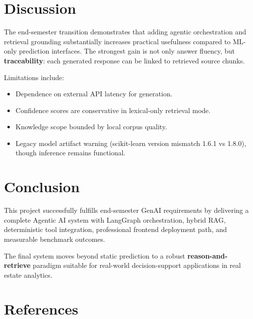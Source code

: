 \documentclass[12pt,a4paper]{article}
\begin{document}
\section{Discussion}
The end-semester transition demonstrates that adding agentic orchestration and retrieval grounding substantially increases practical usefulness compared to ML-only prediction interfaces. The strongest gain is not only answer fluency, but \textbf{traceability}: each generated response can be linked to retrieved source chunks.

Limitations include:
\begin{itemize}[leftmargin=1.6em]
  \item Dependence on external API latency for generation.
  \item Confidence scores are conservative in lexical-only retrieval mode.
  \item Knowledge scope bounded by local corpus quality.
  \item Legacy model artifact warning (scikit-learn version mismatch 1.6.1 vs 1.8.0), though inference remains functional.
\end{itemize}

\section{Conclusion}
This project successfully fulfills end-semester GenAI requirements by delivering a complete Agentic AI system with LangGraph orchestration, hybrid RAG, deterministic tool integration, professional frontend deployment path, and measurable benchmark outcomes.

The final system moves beyond static prediction to a robust \textbf{reason-and-retrieve} paradigm suitable for real-world decision-support applications in real estate analytics.

\section*{References}
\end{document}
